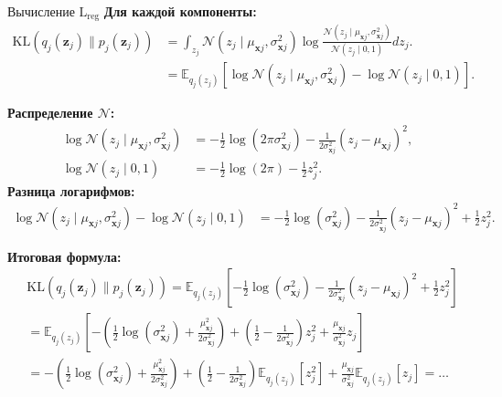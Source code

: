 \begin{frame}[allowframebreaks]{Вычисление $\text{L}_{\text{reg}}$}
    \textbf{Для каждой компоненты:}
    \begin{align*}
        \text{KL}(q_j(\boldsymbol{z}_j) \parallel p_j(\boldsymbol{z}_j)) &= \int_{z_j} \mathcal{N}(z_j \mid \mu_{\boldsymbol{x}j}, \sigma_{\boldsymbol{x}j}^2) \log \frac{\mathcal{N}(z_j \mid \mu_{\boldsymbol{x}j}, \sigma_{\boldsymbol{x}j}^2)}{\mathcal{N}(z_j \mid 0, 1)} dz_j.\\
        &= \mathbb{E}_{q_j(z_j)}\left[\log \mathcal{N}(z_j \mid \mu_{\boldsymbol{x}j}, \sigma_{\boldsymbol{x}j}^2) - \log \mathcal{N}(z_j \mid 0, 1)\right].
    \end{align*}

    \textbf{Распределение $\mathcal{N}$:}
    \begin{align*}
        \log \mathcal{N}(z_j \mid \mu_{\boldsymbol{x}j}, \sigma_{\boldsymbol{x}j}^2) &= -\frac{1}{2}\log(2\pi\sigma_{\boldsymbol{x}j}^2) - \frac{1}{2\sigma_{\boldsymbol{x}j}^2}(z_j - \mu_{\boldsymbol{x}j})^2, \\
        \log \mathcal{N}(z_j \mid 0, 1) &= -\frac{1}{2}\log(2\pi) - \frac{1}{2}z_j^2.
    \end{align*}
    \textbf{Разница логарифмов:}
    \begin{align*}
        \log \mathcal{N}(z_j \mid \mu_{\boldsymbol{x}j}, \sigma_{\boldsymbol{x}j}^2) - \log \mathcal{N}(z_j \mid 0, 1) &= -\frac{1}{2}\log(\sigma_{\boldsymbol{x}j}^2) - \frac{1}{2\sigma_{\boldsymbol{x}j}^2}(z_j - \mu_{\boldsymbol{x}j})^2 + \frac{1}{2}z_j^2.
    \end{align*}

    \textbf{Итоговая формула:}
    \begin{align*}
        & \text{KL}(q_j(\boldsymbol{z}_j) \parallel p_j(\boldsymbol{z}_j)) = \mathbb{E}_{q_j(z_j)}\left[-\frac{1}{2}\log(\sigma_{\boldsymbol{x}j}^2) - \frac{1}{2\sigma_{\boldsymbol{x}j}^2}(z_j - \mu_{\boldsymbol{x}j})^2 + \frac{1}{2}z_j^2\right] \\
        &= \mathbb{E}_{q_j(z_j)}\left[ -\left(\frac{1}{2}\log(\sigma_{\boldsymbol{x}j}^2) + \frac{\mu_{\boldsymbol{x}j}^2}{2\sigma_{\boldsymbol{x}j}^2} \right) + \left(\frac{1}{2} - \frac{1}{2\sigma_{\boldsymbol{x}j}^2}\right)z_j^2 + \frac{\mu_{\boldsymbol{x}j}}{\sigma_{\boldsymbol{x}j}^2}z_j \right] \\
        &= -\left(\frac{1}{2}\log(\sigma_{\boldsymbol{x}j}^2) + \frac{\mu_{\boldsymbol{x}j}^2}{2\sigma_{\boldsymbol{x}j}^2} \right) + \left(\frac{1}{2} - \frac{1}{2\sigma_{\boldsymbol{x}j}^2}\right)\mathbb{E}_{q_j(z_j)}\left[z_j^2 \right] + \frac{\mu_{\boldsymbol{x}j}}{\sigma_{\boldsymbol{x}j}^2} \mathbb{E}_{q_j(z_j)}\left[z_j \right] = \ldots
    \end{align*}


\end{frame}
